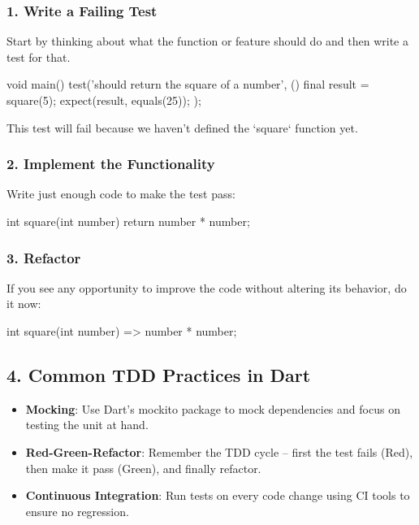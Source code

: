 \subsubsection*{1. Write a Failing Test}

Start by thinking about what the function or feature should do and then write a test for that.

\begin{dartcode}
void main() {
  test('should return the square of a number', () {
    final result = square(5);
    expect(result, equals(25));
  });
}
\end{dartcode}

This test will fail because we haven't defined the `square` function yet.

\subsubsection*{2. Implement the Functionality}

Write just enough code to make the test pass:

\begin{dartcode}
int square(int number) {
  return number * number;
}
\end{dartcode}

\subsubsection*{3. Refactor}

If you see any opportunity to improve the code without altering its behavior, do it now:

\begin{dartcode}
int square(int number) => number * number;
\end{dartcode}

\subsection*{4. Common TDD Practices in Dart}

\begin{itemize}
 \item \textbf{Mocking}: Use Dart's mockito package to mock dependencies and focus on testing the unit at hand.
 \item \textbf{Red-Green-Refactor}: Remember the TDD cycle – first the test fails (Red), then make it pass (Green), and finally refactor.
 \item \textbf{Continuous Integration}: Run tests on every code change using CI tools to ensure no regression.
\end{itemize}

